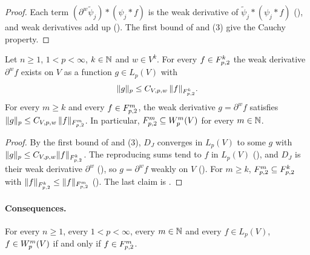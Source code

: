 \begin{proof}
\leanok
Each term $(\partial^w \tilde\psi_j) * (\psi_j * f)$ is the weak derivative of
$\tilde\psi_j * (\psi_j * f)$ (), and weak derivatives
add up (). The first bound of
 and  (3) give the
Cauchy property.
\end{proof}

\begin{theorem}
\label{thm:triebel-lizorkin-to-sobolev}
\leanok
{}
Let $n \geq 1$, $1 < p < \infty$, $k \in \mathbb{N}$ and $w \in V^k$. For every $f \in F^{k}_{p,2}$ the
weak derivative $\partial^w f$ exists on $V$ as a function $g \in L_p(V)$ with
\[
  \|g\|_p \leq C_{V,p,w} \, \|f\|_{F^{k}_{p,2}} .
\]
For every $m \geq k$ and every $f \in F^{m}_{p,2}$, the weak derivative $g = \partial^w f$
satisfies $\|g\|_p \leq C_{V,p,w} \, \|f\|_{F^{m}_{p,2}}$. In particular,
$F^{m}_{p,2} \subseteq W^{m}_{p}(V)$ for every $m \in \mathbb{N}$.
\end{theorem}

\begin{proof}
\leanok
By the first bound of  and
 (3), $D_J$ converges in $L_p(V)$ to some $g$ with
$\|g\|_p \leq C_{V,p,w} \|f\|_{F^{k}_{p,2}}$. The reproducing sums tend to $f$ in $L_p(V)$
(), and $D_J$ is their weak derivative $\partial^w$
(), so $g = \partial^w f$ weakly on $V$
(). For $m \geq k$, $F^{m}_{p,2} \subseteq F^{k}_{p,2}$ with
$\|f\|_{F^{k}_{p,2}} \leq \|f\|_{F^{m}_{p,2}}$ (). The last claim is
.
\end{proof}

\paragraph{Consequences.}

\begin{corollary}[$\Sob{m}{p} = \TL{m}{p}{2}$]
\label{cor:sobolev-triebel-lizorkin}
\leanok
{}
For every $n \geq 1$, every $1 < p < \infty$, every $m \in \mathbb{N}$ and every $f \in L_p(V)$,
$f \in W^{m}_{p}(V)$ if and only if $f \in F^{m}_{p,2}$.
\end{corollary}

